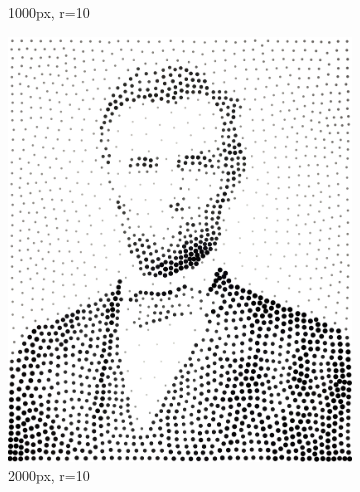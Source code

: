 \documentclass[11pt]{article}
\begin{document}
\begin{figure}[H]
\begin{subfigure}[b]{0.2\linewidth}
		\caption{1000px, r=10}
	\end{subfigure}
	\begin{subfigure}[b]{0.2\linewidth}
		\includegraphics[width=\linewidth]{pix/hc_AL_2000_r10.png}
		\caption{2000px, r=10}
	\end{subfigure}
	\begin{subfigure}[b]{0.2\linewidth}

\end{subfigure}
\end{figure}
\end{document}
